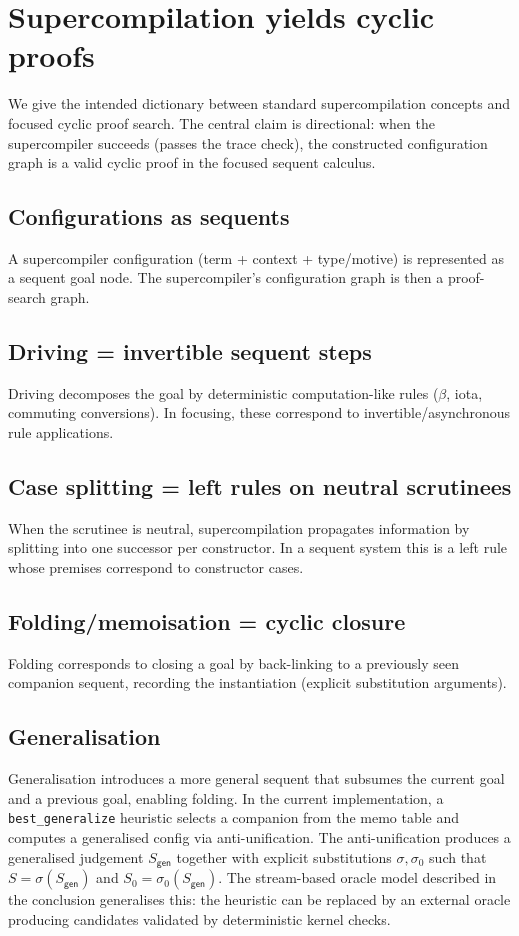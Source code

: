 \section{Supercompilation yields cyclic proofs}
\label{sec:sc-as-search}

We give the intended dictionary between standard supercompilation concepts and focused cyclic proof search. The central claim is directional: when the supercompiler succeeds (passes the trace check), the constructed configuration graph is a valid cyclic proof in the focused sequent calculus.

\subsection{Configurations as sequents}
A supercompiler configuration (term + context + type/motive) is represented as a sequent goal node.
The supercompiler's configuration graph is then a proof-search graph.

\subsection{Driving = invertible sequent steps}
Driving decomposes the goal by deterministic computation-like rules (\(\beta\), iota, commuting conversions). In focusing, these correspond to invertible/asynchronous rule applications.

\subsection{Case splitting = left rules on neutral scrutinees}
When the scrutinee is neutral, supercompilation propagates information by splitting into one successor per constructor. In a sequent system this is a left rule whose premises correspond to constructor cases.

\subsection{Folding/memoisation = cyclic closure}
Folding corresponds to closing a goal by back-linking to a previously seen companion sequent, recording the instantiation (explicit substitution arguments).

\subsection{Generalisation}
Generalisation introduces a more general sequent that subsumes the current goal and a previous goal, enabling folding.
In the current implementation, a \texttt{best\_generalize} heuristic selects a companion from the memo table and computes a generalised config via anti-unification. The anti-unification produces a generalised judgement $S_{\mathsf{gen}}$ together with explicit substitutions $\sigma, \sigma_0$ such that $S = \sigma(S_{\mathsf{gen}})$ and $S_0 = \sigma_0(S_{\mathsf{gen}})$.
The stream-based oracle model described in the conclusion generalises this: the heuristic can be replaced by an external oracle producing candidates validated by deterministic kernel checks.


